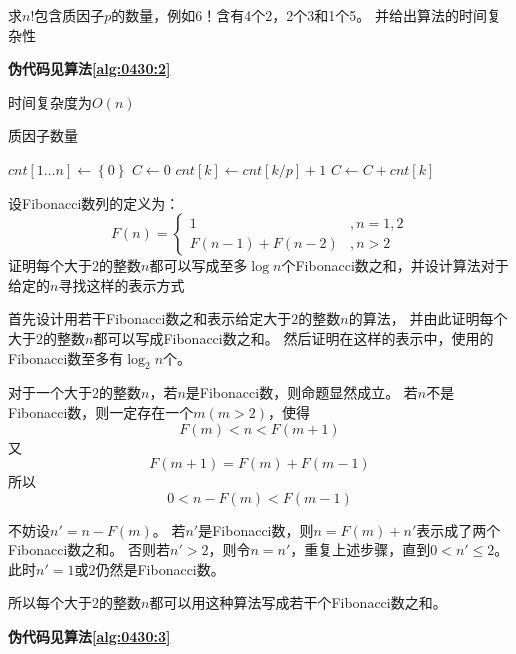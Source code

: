 \documentclass[answers]{exam}
\begin{document}
\begin{questions}
    \question 求$n!$包含质因子$p$的数量，例如$6！$含有4个2，2个3和1个5。
    并给出算法的时间复杂性

    \begin{solution}
        \textbf{伪代码见算法\ref{alg:0430:2}}

        时间复杂度为$O(n)$
    \end{solution}

    \begin{algorithm}[!ht]
        \caption{质因子数量}\label{alg:0430:2}
        \begin{algorithmic}[1]
            \State $cnt[1 \dots n] \gets \left\{0\right\}$
            \State $C \gets 0$
            \State $cnt[k] \gets cnt[k/p] + 1$
            \State $C \gets C + cnt[k]$
            \EndIf
            \EndFor
        \end{algorithmic}
    \end{algorithm}

    \question 设Fibonacci数列的定义为：
    \[
        F(n) = \begin{cases}
            1             & , n=1,2 \\
            F(n-1)+F(n-2) & , n > 2
        \end{cases}
    \]
    证明每个大于$2$的整数$n$都可以写成至多$\log{n}$个Fibonacci数之和，并设计算法对于给定的$n$寻找这样的表示方式
    \begin{solution}
        首先设计用若干Fibonacci数之和表示给定大于$2$的整数$n$的算法，
        并由此证明每个大于$2$的整数$n$都可以写成Fibonacci数之和。
        然后证明在这样的表示中，使用的Fibonacci数至多有$\log_2{n}$个。

        对于一个大于$2$的整数$n$，若$n$是Fibonacci数，则命题显然成立。
        若$n$不是Fibonacci数，则一定存在一个$m(m>2)$，使得\[
            F(m) < n < F(m+1)
        \]
        又\[
            F(m+1) = F(m) + F(m-1)
        \]
        所以\[
            0 < n - F(m) < F(m-1)
        \]

        不妨设$n' = n - F(m)$。
        若$n'$是Fibonacci数，则$n = F(m) + n'$表示成了两个Fibonacci数之和。
        否则若$n' > 2$，则令$n=n'$，重复上述步骤，直到$0 < n' \le 2$。
        此时$n'=1$或$2$仍然是Fibonacci数。

        所以每个大于$2$的整数$n$都可以用这种算法写成若干个Fibonacci数之和。

        \textbf{伪代码见算法\ref{alg:0430:3}}


\end{solution}
\end{questions}
\end{document}
